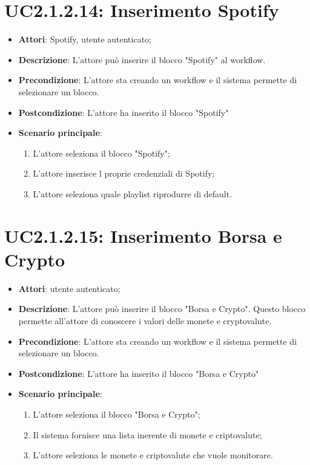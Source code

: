 \section{UC2.1.2.14: Inserimento Spotify}
\label{UC2.1.2.14}
\begin{itemize}
	\item \textbf{Attori}: Spotify, utente autenticato;
	\item \textbf{Descrizione}: L'attore può inserire il blocco "Spotify" al workflow.
	\item \textbf{Precondizione}: L'attore sta creando un workflow e il sistema permette di selezionare un blocco.
	\item \textbf{Postcondizione}: L'attore ha inserito il blocco "Spotify"
	\item \textbf{Scenario principale}:
	\begin{enumerate} \item L'attore seleziona il blocco "Spotify";  \item  L'attore inserisce l proprie credenziali di Spotify;  \item  L'attore seleziona quale playlist riprodurre di default.\end{enumerate}
\end{itemize}

\section{UC2.1.2.15: Inserimento Borsa e Crypto}
\label{UC2.1.2.15}
\begin{itemize}
	\item \textbf{Attori}: utente autenticato;
	\item \textbf{Descrizione}: L'attore può inserire il blocco "Borsa e Crypto". Questo blocco permette all'attore di conoscere i valori delle monete e cryptovalute. 
	\item \textbf{Precondizione}: L'attore sta creando un workflow e il sistema permette di selezionare un blocco.
	\item \textbf{Postcondizione}: L'attore ha inserito il blocco "Borsa e Crypto"
	\item \textbf{Scenario principale}:
	\begin{enumerate} \item L'attore seleziona il blocco "Borsa e Crypto";  \item  Il sistema fornisce una lista inerente di monete e criptovalute;  \item  L'attore seleziona le monete e criptovalute che vuole monitorare.\end{enumerate}
\end{itemize}

